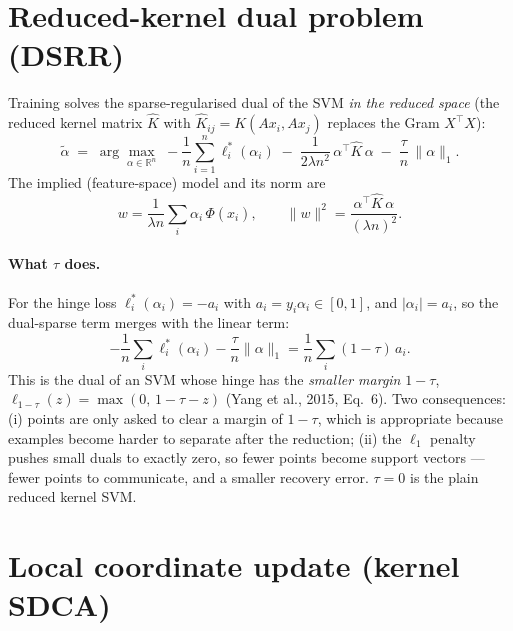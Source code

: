 \documentclass[11pt]{article}
\newcommand{\R}{\mathbb{R}}
\begin{document}
\section{Reduced-kernel dual problem (DSRR)}

Training solves the sparse-regularised dual of the SVM \emph{in the reduced space}
(the reduced kernel matrix $\hat K$ with $\hat K_{ij}=K(Ax_i,Ax_j)$ replaces the
Gram $X^{\top}X$):
\begin{equation}\label{eq:dual}
  \tilde\alpha \;=\; \arg\max_{\alpha\in\R^{n}}\;
  -\frac1n\sum_{i=1}^{n}\ell_i^{*}(\alpha_i)
  \;-\;\frac{1}{2\lambda n^{2}}\,\alpha^{\top}\hat K\,\alpha
  \;-\;\frac{\tau}{n}\,\|\alpha\|_{1}.
\end{equation}
The implied (feature-space) model and its norm are
\begin{equation}\label{eq:w}
  w=\frac{1}{\lambda n}\sum_i \alpha_i\,\Phi(\hat x_i),
  \qquad
  \|w\|^{2}=\frac{\alpha^{\top}\hat K\,\alpha}{(\lambda n)^{2}} .
\end{equation}

\paragraph{What $\tau$ does.} For the hinge loss $\ell_i^{*}(\alpha_i)=-a_i$ with
$a_i=y_i\alpha_i\in[0,1]$, and $|\alpha_i|=a_i$, so the dual-sparse term merges with
the linear term:
\begin{equation}\label{eq:taudual}
  -\frac1n\sum_i\ell_i^{*}(\alpha_i)-\frac{\tau}{n}\|\alpha\|_1
  =\frac{1}{n}\sum_i(1-\tau)\,a_i .
\end{equation}
This is the dual of an SVM whose hinge has the \emph{smaller margin} $1-\tau$,
$\ell_{1-\tau}(z)=\max(0,\,1-\tau-z)$ (Yang et al., 2015, Eq.~6). Two consequences:
(i) points are only asked to clear a margin of $1-\tau$, which is appropriate because
examples become harder to separate after the reduction; (ii) the $\ell_1$ penalty
pushes small duals to exactly zero, so fewer points become support vectors --- fewer
points to communicate, and a smaller recovery error. $\tau=0$ is the plain reduced
kernel SVM.

\section{Local coordinate update (kernel SDCA)}
\end{document}
